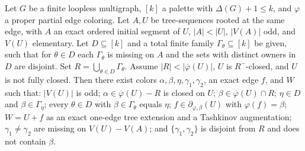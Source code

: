 \begin{lemma}
Let $G$ be a finite loopless multigraph, $[k]$ a palette with
$\Delta(G)+1\le k$, and $\varphi$ a proper partial edge coloring.
Let $A,U$ be tree-sequences rooted at the same edge, with $A$ an exact
ordered initial segment of $U$, $|A|<|U|$, $|V(A)|$ odd, and $V(U)$
elementary. Let $D\subseteq[k]$ and a total finite family
$\Gamma_\theta\subseteq[k]$ be given, such that for $\theta\in D$
each $\Gamma_\theta$ is missing on $A$ and the sets with distinct
owners in $D$ are disjoint. Set $R=\bigcup_{\theta\in D}\Gamma_\theta$.
Assume $|R|<|\overline\varphi(U)|$, $U$ is $R^-$-closed, and $U$ is
not fully closed. Then there exist colors
$\alpha,\beta,\eta,\gamma_1,\gamma_2$, an exact edge $f$, and $W$ such that:
$|V(U)|$ is odd; $\alpha\in\overline\varphi(U)-R$ is closed on $U$;
$\beta\in\overline\varphi(U)\cap R$; $\eta\in D$ and
$\beta\in\Gamma_\eta$; every $\theta\in D$ with
$\beta\in\Gamma_\theta$ equals $\eta$;
$f\in\partial_{\varphi,\beta}(U)$ with $\varphi(f)=\beta$;
$W=U+f$ as an exact one-edge tree extension and a Tashkinov augmentation;
$\gamma_1\ne\gamma_2$ are missing on $V(U)-V(A)$;
and $\{\gamma_1,\gamma_2\}$ is disjoint from $R$ and does not contain $\beta$.
\end{lemma}
